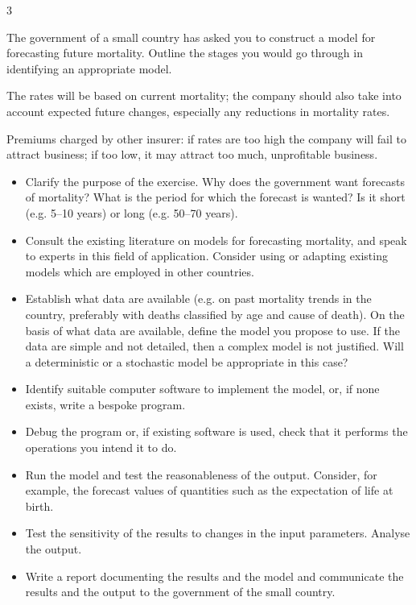 \documentclass[a4paper,12pt]{article}
\begin{document}
3

The government of a small country has asked you to construct a model for forecasting
future mortality.
Outline the stages you would go through in identifying an appropriate model.
\item The rates will be based on current mortality; the company should also take into account expected future changes, especially any reductions in
mortality rates.
\item Premiums charged by other insurer: if rates are too high the company will
fail to attract business; if too low, it may attract too much, unprofitable
business.
\begin{itemize}
\item Clarify the purpose of the exercise. Why does the government want forecasts of
mortality? What is the period for which the forecast is wanted? Is it short (e.g. 5–10
years) or long (e.g. 50–70 years).
\item Consult the existing literature on models for forecasting mortality, and speak to
experts in this field of application. Consider using or adapting existing models which are employed in other countries.
\item Establish what data are available (e.g. on past mortality trends in the country,
preferably with deaths classified by age and cause of death).
On the basis of what data are available, define the model you propose to use. If the
data are simple and not detailed, then a complex model is not justified. Will a
deterministic or a stochastic model be appropriate in this case?
\item Identify suitable computer software to implement the model, or, if none exists, write a
bespoke program.
\item Debug the program or, if existing software is used, check that it performs the
operations you intend it to do.
\item Run the model and test the reasonableness of the output. Consider, for example, the
forecast values of quantities such as the expectation of life at birth.
\item Test the sensitivity of the results to changes in the input parameters.
Analyse the output.
\item Write a report documenting the results and the model and communicate the results
and the output to the government of the small country.
\end{itemize}
\end{document}
